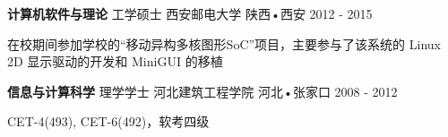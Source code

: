 
\begin{cventries}
  \cventry
    {\textbf{计算机软件与理论} \hspace{0.2cm} 工学硕士} %
    {西安邮电大学} %
    {陕西•西安} %
    {2012 - 2015} %
    {
      \begin{cvitems} %
        \item {在校期间参加学校的“移动异构多核图形SoC”项目，主要参与了该系统的 Linux 2D 显示驱动的开发和 MiniGUI 的移植}
        \item[]
      \end{cvitems}
    }
  \cventry
    {\textbf{信息与计算科学} \hspace{0.2cm} 理学学士} %
    {河北建筑工程学院} %
    {河北•张家口} %
    {2008 - 2012} %
    {
      \begin{cvitems} %
        \item {CET-4(493), CET-6(492)，软考四级}
        \item[]
      \end{cvitems}
    }
\end{cventries}
